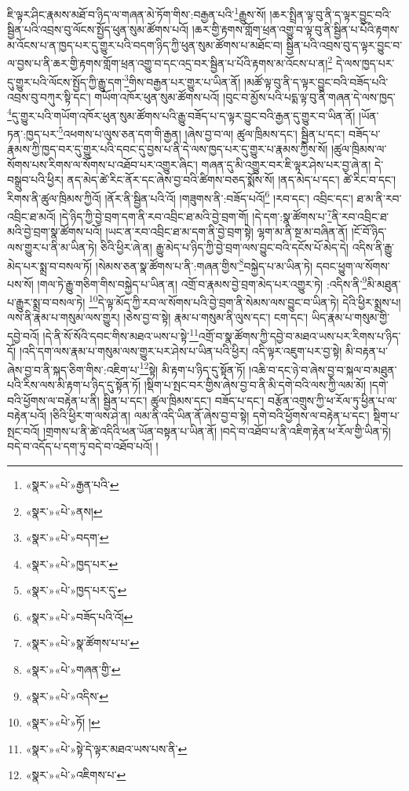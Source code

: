 ཇི་ལྟར་ཤིང་རྣམས་མཐོ་བ་ཉིད་ལ་གཞན་མེ་ཏོག་གིས་:བརྒྱན་པའི་\footnote{«སྣར་»«པེ་»རྒྱན་པའི་}རྒྱུས་སོ། །ཆར་སྤྲིན་ལྟ་བུ་ནི་ད་ལྟར་བྱུང་བའི་སྦྱིན་པའི་འབྲས་བུ་ལོངས་སྤྱོད་ཕུན་སུམ་ཚོགས་པའོ། །ཆར་གྱི་རྟགས་གློག་ཕྲན་འགྱུ་བ་ལྟ་བུ་ནི་སྦྱིན་པ་པོའི་རྟགས་མ་འོངས་པ་ན་ཁྱད་པར་དུ་གྱུར་པའི་བདག་ཉིད་ཀྱི་ཕུན་སུམ་ཚོགས་པ་མཐོང་བ། སྦྱིན་པའི་འབྲས་བུ་ད་ལྟར་བྱུང་བ་ལ་བྱས་པ་ནི་ཆར་གྱི་རྟགས་གློག་ཕྲན་འགྱུ་བ་དང་འདྲ་བར་སྦྱིན་པ་པོའི་རྟགས་མ་འོངས་པ་ན།\footnote{«སྣར་»«པེ་»ནས།} དེ་ལས་ཁྱད་པར་དུ་གྱུར་པའི་ལོངས་སྤྱོད་ཀྱི་རྒྱུ་དག་\footnote{«སྣར་»«པེ་»བདག་}གིས་བརྒྱན་པར་གྱུར་པ་ཡིན་ནོ། །མཚོ་ལྟ་བུ་ནི་ད་ལྟར་བྱུང་བའི་བཟོད་པའི་འབྲས་བུ་བཀུར་སྟི་དང་། གཡོག་འཁོར་ཕུན་སུམ་ཚོགས་པའོ། །བུང་བ་མྱོས་པའི་པདྨ་ལྟ་བུ་ནི་གཞན་དེ་ལས་ཁྱད་\footnote{«སྣར་»«པེ་»ཁྱད་པར་}དུ་གྱུར་པའི་གཡོག་འཁོར་ཕུན་སུམ་ཚོགས་པའི་རྒྱུ་བཟོད་པ་ད་ལྟར་བྱུང་བའི་རྒྱན་དུ་གྱུར་བ་ཡིན་ནོ། །ཡོན་ཏན་:ཁྱད་པར་\footnote{«སྣར་»«པེ་»ཁྱད་པར་དུ་}འཕགས་པ་ལུས་ཅན་དག་གི་རྒྱན། །ཞེས་བྱ་བ་ལ། ཚུལ་ཁྲིམས་དང་། སྦྱིན་པ་དང་། བཟོད་པ་རྣམས་ཀྱི་ཁྱད་བར་དུ་གྱུར་པའི་དབང་དུ་བྱས་པ་ནི་དེ་ལས་ཁྱད་པར་དུ་གྱུར་པ་རྣམས་ཀྱིས་སོ། །ཚུལ་ཁྲིམས་ལ་སོགས་པས་རིགས་ལ་སོགས་པ་འཐོབ་པར་འགྱུར་ཞིང་། གཞན་དུ་མི་འགྱུར་བར་ཇི་ལྟར་ཤེས་པར་བྱ་ཞེ་ན། དེ་བསྒྲུབ་པའི་ཕྱིར། ནད་མེད་ཚེ་རིང་ནོར་དང་ཞེས་བྱ་བའི་ཚིགས་བཅད་སྨོས་སོ། །ནད་མེད་པ་དང་། ཚེ་རིང་བ་དང་། རིགས་ནི་ཚུལ་ཁྲིམས་ཀྱིའོ། །ནོར་ནི་སྦྱིན་པའི་འོ། །གཟུགས་ནི་:བཟོད་པའོ།\footnote{«སྣར་»«པེ་»བཟོད་པའི་འོ།} །རབ་དང་། འབྲིང་དང་། ཐ་མ་ནི་རབ་འབྲིང་ཐ་མའོ། །དེ་ཉིད་ཀྱི་བྱེ་བྲག་དག་ནི་རབ་འབྲིང་ཐ་མའི་བྱེ་བྲག་གོ། །དེ་དག་:སྣ་ཚོགས་པ་\footnote{«སྣར་»«པེ་»སྣ་ཚོགས་པ་པ་}ནི་རབ་འབྲིང་ཐ་མའི་བྱེ་བྲག་སྣ་ཚོགས་པའོ། །ཡང་ན་རབ་འབྲིང་ཐ་མ་དག་ནི་བྱེ་བྲག་སྟེ། ལྷག་མ་ནི་སྔ་མ་བཞིན་ནོ། །ངོ་བོ་ཉིད་ལས་གྱུར་པ་ནི་མ་ཡིན་ཏེ། ཅིའི་ཕྱིར་ཞེ་ན། རྒྱུ་མེད་པ་ཉིད་ཀྱི་བྱེ་བྲག་ལས་བྱུང་བའི་དངོས་པོ་མེད་དེ། འདིས་ནི་རྒྱུ་མེད་པར་སྨྲ་བ་བསལ་ཏོ། །སེམས་ཅན་སྣ་ཚོགས་པ་ནི་:གཞན་གྱིས་\footnote{«སྣར་»«པེ་»གཞན་གྱི་}བསྐྱེད་པ་མ་ཡིན་ཏེ། དབང་ཕྱུག་ལ་སོགས་པས་སོ། །གལ་ཏེ་རྒྱུ་གཅིག་གིས་བསྐྱེད་པ་ཡིན་ན། འགྲོ་བ་རྣམས་བྱེ་བྲག་མེད་པར་འགྱུར་ཏེ། :འདིས་ནི་\footnote{«སྣར་»«པེ་»འདིས་}མི་མཐུན་པ་རྒྱུར་སྨྲ་བ་བསལ་ཏེ། \footnote{«སྣར་»«པེ་»ཏོ། ། }དེ་ལྟ་མོད་ཀྱི་རབ་ལ་སོགས་པའི་བྱེ་བྲག་ནི་སེམས་ལས་བྱུང་བ་ཡིན་ཏེ། དེའི་ཕྱིར་སྨྲས་པ། ལས་ནི་རྣམ་པ་གསུམ་ལས་གྱུར། །ཅེས་བྱ་བ་སྟེ། རྣམ་པ་གསུམ་ནི་ལུས་དང་། ངག་དང་། ཡིད་རྣམ་པ་གསུམ་གྱི་དབྱེ་བའོ། །དེ་ནི་སོ་སོའི་དབང་གིས་མཐའ་ཡས་པ་སྟེ་\footnote{«སྣར་»«པེ་»སྟེ་དེ་ལྟར་མཐའ་ཡས་པས་ནི་}འགྲོ་བ་སྣ་ཚོགས་ཀྱི་དབྱེ་བ་མཐའ་ཡས་པར་རིགས་པ་ཉིད་དོ། །འདི་དག་ལས་རྣམ་པ་གསུམ་ལས་གྱུར་པར་ཤེས་པ་ཡིན་པའི་ཕྱིར། འདི་ལྟར་འཇུག་པར་བྱ་སྟེ། མི་བརྟན་པ་ཞེས་བྱ་བ་ནི་སྐད་ཅིག་གིས་:འཇིག་པ་\footnote{«སྣར་»«པེ་»འཇིགས་པ་}སྟེ། མི་རྟག་པ་ཉིད་དུ་སྟོན་ཏོ། །འཆི་བ་དང་ཉེ་བ་ཞེས་བྱ་བ་སྐལ་བ་མཐུན་པའི་རིས་ལས་མི་རྟག་པ་ཉིད་དུ་སྟོན་ཏོ། །སྡིག་པ་སྤང་བར་གྱིས་ཞེས་བྱ་བ་ནི་མི་དགེ་བའི་ལས་ཀྱི་ལམ་མོ། །དགེ་བའི་ཕྱོགས་ལ་བརྟེན་པ་ནི། སྦྱིན་པ་དང་། ཚུལ་ཁྲིམས་དང་། བཟོད་པ་དང་། བརྩོན་འགྲུས་ཀྱི་ཕ་རོལ་ཏུ་ཕྱིན་པ་ལ་བརྟེན་པའོ། །ཅིའི་ཕྱིར་ག་ལས་ཤེ་ན། ལམ་ནི་འདི་ཡིན་ནོ་ཞེས་བྱ་བ་སྟེ། དགེ་བའི་ཕྱོགས་ལ་བརྟེན་པ་དང་། སྡིག་པ་སྤང་བའོ། །གྲགས་པ་ནི་ཚེ་འདིའི་ཕན་ཡོན་བསྟན་པ་ཡིན་ནོ། །བདེ་བ་འཐོབ་པ་ནི་འཇིག་རྟེན་ཕ་རོལ་གྱི་ཡིན་ཏེ། བདེ་བ་འདོད་པ་དག་ཏུ་བདེ་བ་འཐོབ་པའོ། །

